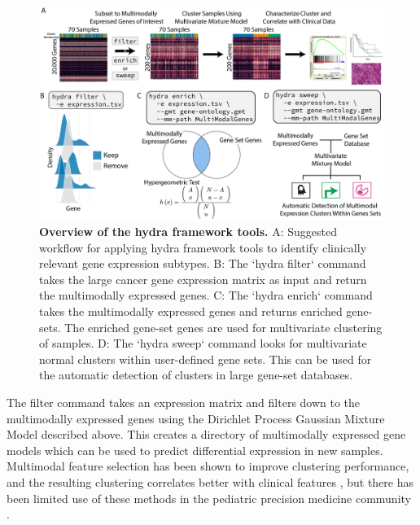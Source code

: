 \documentclass[10pt,letterpaper]{article}
\begin{document}
\begin{figure}[h!]
	\includegraphics[width=\textwidth]{"img/overview-fig"}
	\caption{{\bf Overview of the hydra framework tools.}
		A: Suggested workflow for applying hydra framework tools to identify clinically relevant gene expression subtypes. B: The `hydra filter` command takes the large cancer gene expression matrix as input and return the multimodally expressed genes. C: The `hydra enrich` command takes the multimodally expressed genes and returns enriched gene-sets. The enriched gene-set genes are used for multivariate clustering of samples. D: The `hydra sweep` command looks for multivariate normal clusters within user-defined gene sets. This can be used for the automatic detection of clusters in large gene-set databases.
		\label{overview}}
\end{figure}

The filter command takes an expression matrix and filters down to the multimodally expressed genes using the Dirichlet Process Gaussian Mixture Model described above. This creates a directory of multimodally expressed gene models which can be used to predict differential expression in new samples. Multimodal feature selection has been shown to improve clustering performance, and the resulting clustering correlates better with clinical features \cite{yiliMultimodalityCriterionFeature2005}, but there has been limited use of these methods in the pediatric precision medicine community \cite{modyIntegrativeClinicalSequencing2015, worstNextgenerationPersonalisedMedicine2016, obergImplementationNextGeneration2016}. 
\end{document}
